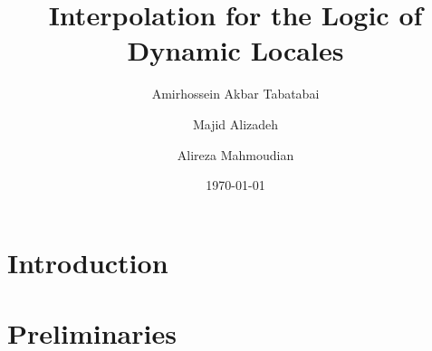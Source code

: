 \documentclass[10pt,a4paper]{amsart}
\begin{document}
\title{Interpolation for the Logic of Dynamic Locales}
\author{Amirhossein Akbar Tabatabai}


\author{Majid Alizadeh}

\author{Alireza Mahmoudian}

\date{\today}
 
\begin{abstract}
	
\end{abstract}

\maketitle



\section{Introduction}


\section{Preliminaries}




\end{document}
